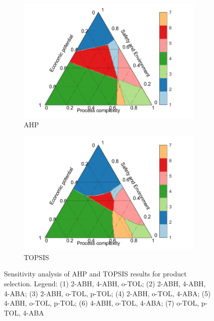 \begin{figure}[h]
    \centering
    \begin{subfigure}{0.49\linewidth}
        \includegraphics[width=\linewidth]{chapters/1-synthesis/1-Figures/AHP_product.pdf}
        \caption{AHP}
    \end{subfigure}
    \begin{subfigure}{0.49\linewidth}
        \includegraphics[width=\linewidth]{chapters/1-synthesis/1-Figures/TOPSIS_product.pdf}
        \caption{TOPSIS}
    \end{subfigure}
    \caption{Sensitivity analysis of AHP and TOPSIS results for product selection. Legend: (1) 2-ABH, 4-ABH, o-TOL; (2) 2-ABH, 4-ABH, 4-ABA; (3) 2-ABH, o-TOL, p-TOL; (4) 2-ABH, o-TOL, 4-ABA; (5) 4-ABH, o-TOL, p-TOL; (6) 4-ABH, o-TOL, 4-ABA; (7) o-TOL, p-TOL, 4-ABA}%
    \label{fig:sensitivity_product}%
\end{figure}

